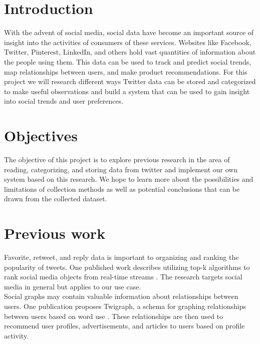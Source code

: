 \documentclass[11pt]{article}
\begin{document}
\maketitle

\section{Introduction}
With the advent of social media, social data have become an important source of insight into the activities of consumers of these services. Websites like Facebook, Twitter, Pinterest, LinkedIn, and others hold vast quantities of information about the people using them. This data can be used to track and predict social trends, map relationships between users, and make product recommendations. For this project we will research different ways Twitter data can be stored and categorized to make useful observations and build a system that can be used to gain insight into social trends and user preferences. 

\section{Objectives}
The objective of this project is to explore previous research in the area of reading, categorizing, and storing data from twitter and implement our own system based on this research. We hope to learn more about the possibilities and limitations of collection methods as well as potential conclusions that can be drawn from the collected dataset.

\section{Previous work}\label{previous work}
Favorite, retweet, and reply data is important to organizing and ranking the popularity of tweets. One published work describes utilizing top-k algorithms to rank social media objects from real-time streams \cite{DBLP:journals/corr/VouzoukidouAC16}. The research targets social media in general but applies to our use case.\\

Social graphs may contain valuable information about relationships between users. One publication proposes Twigraph, a schema for graphing relationships between users based on word use \cite{DBLP:journals/corr/SundararamanS17}. These relationships are then used to recommend user profiles, advertisements, and articles to users based on profile activity.\\
\end{document}
